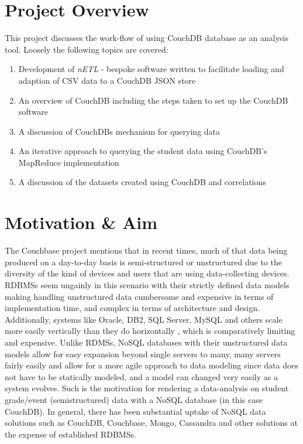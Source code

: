 \section{Project Overview}
This project discusses the work-flow of using CouchDB database as an analysis tool. Loosely the following topics are covered:

\begin{enumerate}
    \item Development of \textit{nETL} - bespoke software written to facilitate loading and adaption of CSV data to a CouchDB JSON store
    \item An overview of CouchDB including the steps taken to set up the CouchDB software
    \item A discussion of CouchDBs mechanism for querying data
    \item An iterative approach to querying the student data using CouchDB's MapReduce implementation
    \item A discussion of the datasets created using CouchDB and correlations
\end{enumerate}

\section{Motivation \& Aim}
The Couchbase project \cite{couchbaseWhitePaper} mentions that in recent times, much of that data being produced on a day-to-day basis is semi-structured or unstructured due to the diversity of the kind of devices and users that are using data-collecting devices. RDBMSs seem ungainly in this scenario with their strictly defined data models making handling unstructured data cumbersome and expensive in terms of implementation time, and complex in terms of architecture and design. Additionally, systems like Oracle, DB2, SQL Server, MySQL and others scale more easily vertically than they do horizontally \cite{couchbaseWhitePaper}, which is comparatively limiting and expensive. Unlike RDMSs, NoSQL databases with their unstructured data models allow for easy expansion beyond single servers to many, many servers fairly easily and allow for a more agile approach to data modeling since data does not have to be statically modeled, and a model can changed very easily as a system evolves. Such is the motivation for rendering a data-analysis on student grade/event (semistructured) data with a NoSQL database (in this case CouchDB). In general, there has been substantial uptake of NoSQL data solutions such as CouchDB, Couchbase, Mongo, Cassandra and other solutions at the expense of established RDBMSs.

